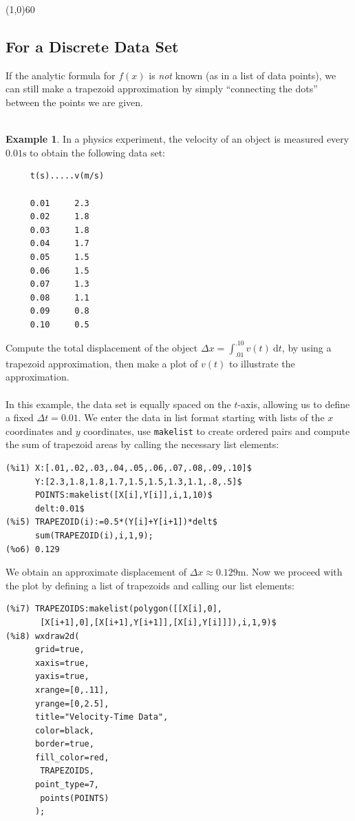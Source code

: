 \documentclass[10.5pt,twoside]{report}
\theoremstyle{definition}
\newtheorem{exmp}{Example}[section]
\begin{document}
\line(1,0){60}
\linethickness{0.5mm}


\subsection{For a Discrete Data Set}

If the analytic formula for $f(x)$ is \textit{not} known (as in a list of data points), we can still make a trapezoid approximation by simply ``connecting the dots'' between the points we are given.  \\
${}$\\
\begin{exmp} In a physics experiment, the velocity of an object is measured every $0.01 \mathrm{s}$ to obtain the following data set:


\begin{verbatim}
     t(s).....v(m/s)
 
     0.01     2.3
     0.02     1.8
     0.03     1.8
     0.04     1.7
     0.05     1.5
     0.06     1.5
     0.07     1.3
     0.08     1.1
     0.09     0.8
     0.10     0.5
\end{verbatim}

Compute the total displacement of the object $\Delta x = \displaystyle \int_{.01}^{.10} v(t)\ \mathrm{d}t$, by using a trapezoid approximation, then make a plot of $v(t)$ to illustrate the approximation.\\
${}$\\
In this example, the data set is equally spaced on the $t$-axis, allowing us to define a fixed $\Delta t = 0.01$.  We enter the data in list format starting with lists of the $x$ coordinates and $y$ coordinates, use \verb|makelist| to create ordered pairs and compute the sum of trapezoid areas by calling the necessary list elements:

\begin{verbatim}
(%i1) X:[.01,.02,.03,.04,.05,.06,.07,.08,.09,.10]$
      Y:[2.3,1.8,1.8,1.7,1.5,1.5,1.3,1.1,.8,.5]$
      POINTS:makelist([X[i],Y[i]],i,1,10)$
      delt:0.01$
(%i5) TRAPEZOID(i):=0.5*(Y[i]+Y[i+1])*delt$
      sum(TRAPEZOID(i),i,1,9);
(%o6) 0.129
\end{verbatim}

We obtain an approximate displacement of $\Delta x \approx 0.129 \mathrm{m}$.  Now we proceed with the plot by defining a list of trapezoids and calling our list elements:

\begin{verbatim}
(%i7) TRAPEZOIDS:makelist(polygon([[X[i],0],
       [X[i+1],0],[X[i+1],Y[i+1]],[X[i],Y[i]]]),i,1,9)$
(%i8) wxdraw2d(
      grid=true,
      xaxis=true,
      yaxis=true,
      xrange=[0,.11],
      yrange=[0,2.5],
      title="Velocity-Time Data",
      color=black,
      border=true,
      fill_color=red,
       TRAPEZOIDS,
      point_type=7,
       points(POINTS)
      );
\end{verbatim}


\end{exmp}
\end{document}
